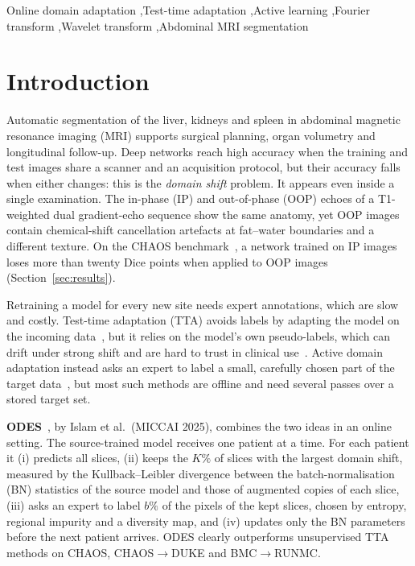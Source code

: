\documentclass[a4paper,fleqn]{cas-dc}
\begin{document}
\begin{keywords}
Online domain adaptation \sep Test-time adaptation \sep Active learning \sep Fourier transform \sep Wavelet transform \sep Abdominal MRI segmentation
\end{keywords}

\maketitle

\section{Introduction}
Automatic segmentation of the liver, kidneys and spleen in abdominal magnetic resonance imaging (MRI) supports surgical planning, organ volumetry and longitudinal follow-up. Deep networks reach high accuracy when the training and test images share a scanner and an acquisition protocol, but their accuracy falls when either changes: this is the \emph{domain shift} problem. It appears even inside a single examination. The in-phase (IP) and out-of-phase (OOP) echoes of a T1-weighted dual gradient-echo sequence show the same anatomy, yet OOP images contain chemical-shift cancellation artefacts at fat--water boundaries and a different texture. On the CHAOS benchmark~\cite{kavur2021chaos}, a network trained on IP images loses more than twenty Dice points when applied to OOP images (Section~\ref{sec:results}).

Retraining a model for every new site needs expert annotations, which are slow and costly. Test-time adaptation (TTA) avoids labels by adapting the model on the incoming data~\cite{liang2025survey,wang2022cotta}, but it relies on the model's own pseudo-labels, which can drift under strong shift and are hard to trust in clinical use~\cite{zhou2025tegda,wu2026sictta}. Active domain adaptation instead asks an expert to label a small, carefully chosen part of the target data~\cite{xie2022ripu,safaei2025certainty}, but most such methods are offline and need several passes over a stored target set.

\textbf{ODES}~\cite{islam2025odes}, by Islam et al.\ (MICCAI 2025), combines the two ideas in an online setting. The source-trained model receives one patient at a time. For each patient it (i) predicts all slices, (ii) keeps the $K\%$ of slices with the largest domain shift, measured by the Kullback--Leibler divergence between the batch-normalisation (BN) statistics of the source model and those of augmented copies of each slice, (iii) asks an expert to label $b\%$ of the pixels of the kept slices, chosen by entropy, regional impurity and a diversity map, and (iv) updates only the BN parameters before the next patient arrives. ODES clearly outperforms unsupervised TTA methods on CHAOS, CHAOS$\rightarrow$DUKE and BMC$\rightarrow$RUNMC.
\end{document}
